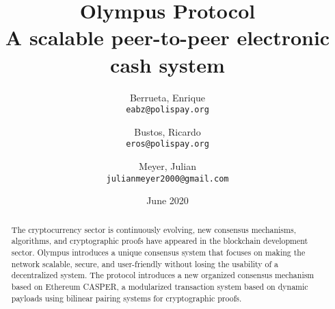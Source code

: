 \documentclass{article}
\title{%
  Olympus Protocol \\
  \large A scalable peer-to-peer electronic cash system}
\author{
  Berrueta, Enrique\\
  \texttt{eabz@polispay.org}
  \and
  Bustos, Ricardo\\
  \texttt{eros@polispay.org}
  \and
  Meyer, Julian\\
  \texttt{julianmeyer2000@gmail.com}
}
\date{June 2020}
\begin{document}
	\maketitle
	\begin{abstract}
		The cryptocurrency sector is continuously evolving, new consensus mechanisms, algorithms, and cryptographic proofs have appeared in the blockchain development sector. Olympus introduces a unique consensus system that focuses on making the network scalable, secure, and user-friendly without losing the usability of a decentralized system. The protocol introduces a new organized consensus mechanism based on Ethereum CASPER, a modularized transaction system based on dynamic payloads using bilinear pairing systems for cryptographic proofs.
	\end{abstract}
	
	\newpage
	\tableofcontents		
	
\end{document}
